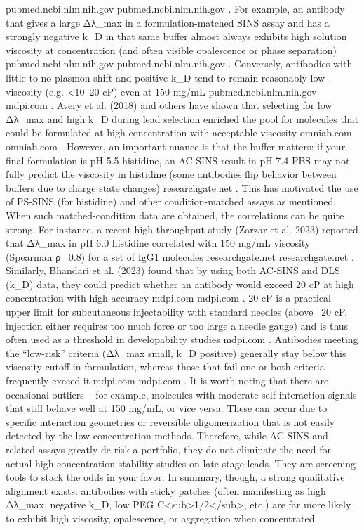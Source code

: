 pubmed.ncbi.nlm.nih.gov
pubmed.ncbi.nlm.nih.gov
. For example, an antibody that gives a large Δλ_max in a formulation-matched SINS assay and has a strongly negative k_D in that same buffer almost always exhibits high solution viscosity at concentration (and often visible opalescence or phase separation)
pubmed.ncbi.nlm.nih.gov
pubmed.ncbi.nlm.nih.gov
. Conversely, antibodies with little to no plasmon shift and positive k_D tend to remain reasonably low-viscosity (e.g. <10–20 cP) even at 150 mg/mL
pubmed.ncbi.nlm.nih.gov
mdpi.com
. Avery et al. (2018) and others have shown that selecting for low Δλ_max and high k_D during lead selection enriched the pool for molecules that could be formulated at high concentration with acceptable viscosity
omniab.com
omniab.com
. However, an important nuance is that the buffer matters: if your final formulation is pH 5.5 histidine, an AC-SINS result in pH 7.4 PBS may not fully predict the viscosity in histidine (some antibodies flip behavior between buffers due to charge state changes)
researchgate.net
. This has motivated the use of PS-SINS (for histidine) and other condition-matched assays as mentioned. When such matched-condition data are obtained, the correlations can be quite strong. For instance, a recent high-throughput study (Zarzar et al. 2023) reported that Δλ_max in pH 6.0 histidine correlated with 150 mg/mL viscosity (Spearman ρ ~0.8) for a set of IgG1 molecules
researchgate.net
researchgate.net
. Similarly, Bhandari et al. (2023) found that by using both AC-SINS and DLS (k_D) data, they could predict whether an antibody would exceed 20 cP at high concentration with high accuracy
mdpi.com
mdpi.com
. 20 cP is a practical upper limit for subcutaneous injectability with standard needles (above ~20 cP, injection either requires too much force or too large a needle gauge) and is thus often used as a threshold in developability studies
mdpi.com
. Antibodies meeting the “low-risk” criteria (Δλ_max small, k_D positive) generally stay below this viscosity cutoff in formulation, whereas those that fail one or both criteria frequently exceed it
mdpi.com
mdpi.com
. It is worth noting that there are occasional outliers – for example, molecules with moderate self-interaction signals that still behave well at 150 mg/mL, or vice versa. These can occur due to specific interaction geometries or reversible oligomerization that is not easily detected by the low-concentration methods. Therefore, while AC-SINS and related assays greatly de-risk a portfolio, they do not eliminate the need for actual high-concentration stability studies on late-stage leads. They are screening tools to stack the odds in your favor. In summary, though, a strong qualitative alignment exists: antibodies with sticky patches (often manifesting as high Δλ_max, negative k_D, low PEG C<sub>1/2</sub>, etc.) are far more likely to exhibit high viscosity, opalescence, or aggregation when concentrated
